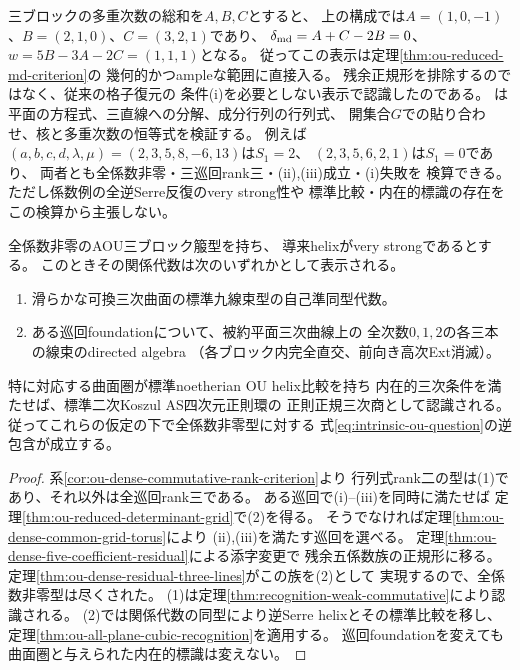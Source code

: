 \begin{remark}
\label{rem:ou-dense-residual-multidegree}
三ブロックの多重次数の総和を$A,B,C$とすると、
上の構成では$A=(1,0,-1)$、$B=(2,1,0)$、$C=(3,2,1)$であり、
$\delta_{\rm md}=A+C-2B=0$、$w=5B-3A-2C=(1,1,1)$となる。
従ってこの表示は定理\ref{thm:ou-reduced-md-criterion}の
幾何的かつampleな範囲に直接入る。
残余正規形を排除するのではなく、従来の格子復元の
条件(i)を必要としない表示で認識したのである。
は
平面の方程式、三直線への分解、成分行列の行列式、
開集合$G$での貼り合わせ、核と多重次数の恒等式を検証する。
例えば$(a,b,c,d,\lambda,\mu)=(2,3,5,8,-6,13)$は$S_1=2$、
$(2,3,5,6,2,1)$は$S_1=0$であり、
両者とも全係数非零・三巡回rank三・(ii),(iii)成立・(i)失敗を
検算できる。ただし係数例の全逆Serre反復のvery strong性や
標準比較・内在的標識の存在をこの検算から主張しない。
\end{remark}

\begin{theorem}[全係数非零のOU三次型の認識]
\label{thm:ou-dense-complete-recognition}
全係数非零のAOU三ブロック箙型を持ち、
導来helixがvery strongであるとする。
このときその関係代数は次のいずれかとして表示される。
\begin{enumerate}
 \item 滑らかな可換三次曲面の標準九線束型の自己準同型代数。
 \item ある巡回foundationについて、被約平面三次曲線上の
 全次数$0,1,2$の各三本の線束のdirected algebra
 （各ブロック内完全直交、前向き高次Ext消滅）。
\end{enumerate}
特に対応する曲面圏が標準noetherian OU helix比較を持ち
内在的三次条件を満たせば、標準二次Koszul AS四次元正則環の
正則正規三次商として認識される。
従ってこれらの仮定の下で全係数非零型に対する
式\eqref{eq:intrinsic-ou-question}の逆包含が成立する。
\end{theorem}
\begin{proof}
系\ref{cor:ou-dense-commutative-rank-criterion}より
行列式rank二の型は(1)であり、それ以外は全巡回rank三である。
ある巡回で(i)--(iii)を同時に満たせば
定理\ref{thm:ou-reduced-determinant-grid}で(2)を得る。
そうでなければ定理\ref{thm:ou-dense-common-grid-torus}により
(ii),(iii)を満たす巡回を選べる。
定理\ref{thm:ou-dense-five-coefficient-residual}による添字変更で
残余五係数族の正規形に移る。
定理\ref{thm:ou-dense-residual-three-lines}がこの族を(2)として
実現するので、全係数非零型は尽くされた。
(1)は定理\ref{thm:recognition-weak-commutative}により認識される。
(2)では関係代数の同型により逆Serre helixとその標準比較を移し、
定理\ref{thm:ou-all-plane-cubic-recognition}を適用する。
巡回foundationを変えても曲面圏と与えられた内在的標識は変えない。
\end{proof}

